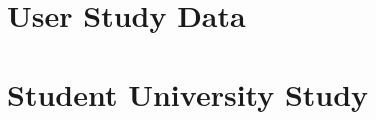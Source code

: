 \documentclass{l4proj}
\begin{document}
\begin{appendices}
\chapter{User Study Data}

\label{appendix:userstudydata}

\chapter{Student University Study}

\label{appendix:studentunistudy}
\end{appendices}






\end{document}

